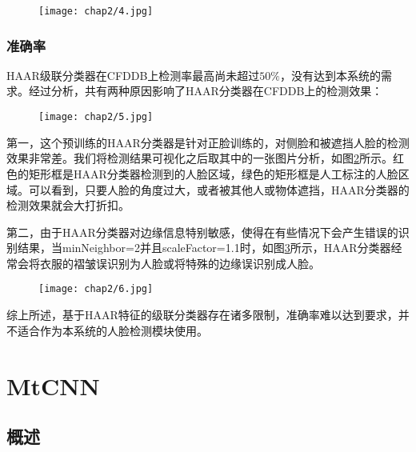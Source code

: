 \begin{figure}[!htp]
	\centering
	\texttt{[image: chap2/4.jpg]}
	\label{fig:haartest:speed}
\end{figure}

\subsubsection{准确率}

HAAR级联分类器在CFDDB上检测率最高尚未超过$50\%$，没有达到本系统的需求。经过分析，共有两种原因影响了HAAR分类器在CFDDB上的检测效果：

\begin{figure}[!htp]
	\centering
	\texttt{[image: chap2/5.jpg]}
	\label{fig:haartest:acc}
\end{figure}

第一，这个预训练的HAAR分类器是针对正脸训练的，对侧脸和被遮挡人脸的检测效果非常差。我们将检测结果可视化之后取其中的一张图片分析，如图\ref{fig:haartest:acc}所示。红色的矩形框是HAAR分类器检测到的人脸区域，绿色的矩形框是人工标注的人脸区域。可以看到，只要人脸的角度过大，或者被其他人或物体遮挡，HAAR分类器的检测效果就会大打折扣。

第二，由于HAAR分类器对边缘信息特别敏感，使得在有些情况下会产生错误的识别结果，当minNeighbor=2并且scaleFactor=1.1时，如图\ref{fig:haartest:acc2}所示，HAAR分类器经常会将衣服的褶皱误识别为人脸或将特殊的边缘误识别成人脸。

\begin{figure}[!htp]
	\centering
	\texttt{[image: chap2/6.jpg]}
	\label{fig:haartest:acc2}
\end{figure}

综上所述，基于HAAR特征的级联分类器存在诸多限制，准确率难以达到要求，并不适合作为本系统的人脸检测模块使用。

\section{MtCNN}

\subsection{概述}

